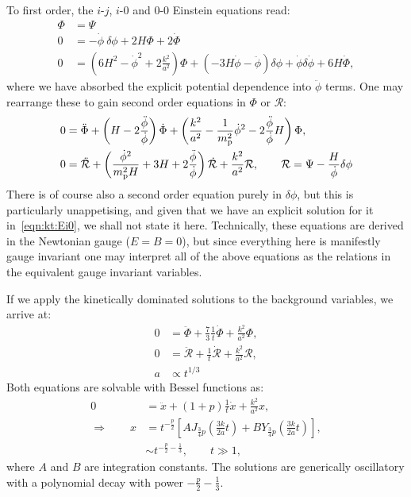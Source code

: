 To first order, the \(i\)-\(j\), \(i\)-\(0\) and \(0\)-\(0\) Einstein equations read:
\begin{align}
  \Phi &= \Psi 
  \label{eqn:kt:Eij} \\
  0 &= -\dot{\phi}\:\delta\phi  + 2 H \Phi + 2 \dot{\Phi} 
  \label{eqn:kt:Ei0}\\
  0 &= \left(6H^2-\dot{\phi}^2 + 2\frac{k^2}{a^2}\right)\Phi  + \left( -3H\dot{\phi} - \ddot{\phi} \right)\delta\phi + \dot{\phi}\delta\dot{\phi} +  6 H \dot{\Phi},
  \label{eqn:kt:E00}
\end{align}
where we have absorbed the explicit potential dependence into \(\ddot{\phi}\) terms. 
One may rearrange these to gain second order equations in \(\Phi\) or \(\mathcal{R}\):
\begin{align}
  0 &= \ddot{\Phi} + \left( H - 2 \frac{\ddot{\phi}}{\dot{\phi}} \right) \dot{\Phi} + \left( \frac{k^2}{a^2}-\frac{1}{m_{\mathrm{p}}^2}\dot{\phi}^2 - 2\frac{\ddot{\phi}}{\dot{\phi}}H \right)\Phi, \\
  0 &= \ddot{\mathcal{R}} + \left( \frac{\dot{\phi}^2}{m_{\mathrm{p}}^2H} + 3H + 2\frac{\ddot{\phi}}{\dot{\phi}} \right)\dot{\mathcal{R}} + \frac{k^2}{a^2}\mathcal{R}, \qquad \mathcal{R} = \Psi - \frac{H}{\dot{\phi}}\delta\phi
\end{align}
There is of course also a second order equation purely in \(\delta\phi\), but this is particularly unappetising, and given that we have an explicit solution for it in~\eqref{eqn:kt:Ei0}, we shall not state it here.
Technically, these equations are derived in the Newtonian gauge (\(E=B=0\)), but since everything here is manifestly gauge invariant one may interpret all of the above equations as the relations in the equivalent gauge invariant variables.

If we apply the kinetically dominated solutions to the background variables, we arrive at:
\begin{align}
  0 &= \ddot{\Phi} + \frac{7}{3}\frac{1}{t}\dot{\Phi} + \frac{k^2}{a^2} \Phi,\\
  0 &= \ddot{\mathcal{R}} + \frac{1}{t}\dot{\mathcal{R}} + \frac{k^2}{a^2} \mathcal{R},\\
  a &\propto t^{1/3}
\end{align}
Both equations are solvable with Bessel functions as:
\begin{align}
  0 &=\ddot{x} + (1+p)\frac{1}{t}\dot{x} + \frac{k^2}{a^2} x,  \\
  \Rightarrow \qquad
  x &= t^{-\frac{p}{2}}\left[ A J_{\frac{3}{4}p}\left( \frac{3k}{2a} t \right) + B Y_{\frac{3}{4}p}\left( \frac{3k}{2a} t \right) \right], \\
  &\sim  t^{-\frac{p}{2}-\frac{1}{3}}, \qquad t \gg 1,
\end{align}
where \(A\) and \(B\) are integration constants. The solutions are generically oscillatory with a polynomial decay with power \(-\frac{p}{2} - \frac{1}{3}\).

